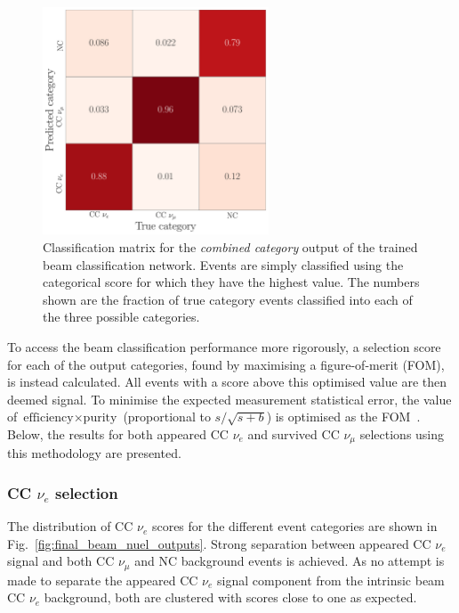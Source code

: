 \begin{figure} %
    \includegraphics[width=0.6\textwidth]{diagrams/7-results/final_comb_cat_confusion.pdf}
    \caption[Classification matrix for the combined category output of the beam classification
        network] {Classification matrix for the \emph{combined category} output of the trained
        beam classification network. Events are simply classified using the categorical score for
        which they have the highest value. The numbers shown are the fraction of true category
        events classified into each of the three possible categories.}
    \label{fig:final_comb_cat_confusion}
\end{figure}

To access the beam classification performance more rigorously, a selection score for each of the
output categories, found by maximising a figure-of-merit (FOM), is instead calculated. All events
with a score above this optimised value are then deemed signal. To minimise the expected
measurement statistical error, the value of $\text{efficiency}\times\text{purity}$ (proportional
to $s/\sqrt{s+b}$) is optimised as the FOM~\cite{list2002}. Below, the results for both appeared
CC $\nu_{e}$ and survived CC $\nu_{\mu}$ selections using this methodology are presented.

\subsubsection*{CC $\nu_{e}$ selection} %

The distribution of CC $\nu_{e}$ scores for the different event categories are shown in
Fig.~\ref{fig:final_beam_nuel_outputs}. Strong separation between appeared CC $\nu_{e}$ signal and
both CC $\nu_{\mu}$ and NC background events is achieved. As no attempt is made to separate the
appeared CC $\nu_{e}$ signal component from the intrinsic beam CC $\nu_{e}$ background, both are
clustered with scores close to one as expected.

